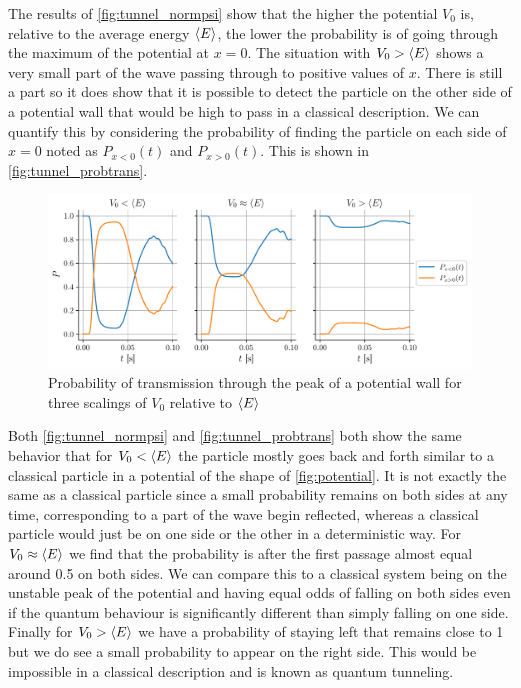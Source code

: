 The results of \autoref{fig:tunnel_normpsi} show that the higher the potential $V_0$ is, relative to the average energy $\langle E \rangle$, the lower the probability is of going through the maximum of the potential at $x=0$. The situation with $V_0 > \langle E \rangle$ shows a very small part of the wave passing through to positive values of $x$. There is still a part so it does show that it is possible to detect the particle on the other side of a potential wall that would be high to pass in a classical description. We can quantify this by considering the probability of finding the particle on each side of $x=0$ noted as $P_{x<0}(t)$ and $P_{x>0}(t)$. This is shown in \autoref{fig:tunnel_probtrans}.
\begin{figure}[h]
    \centering
    \includegraphics[width=\linewidth]{figures/tunnel_probtrans.pdf}
    \caption{Probability of transmission through the peak of a potential wall for three scalings of $V_0$ relative to $\langle E \rangle$}
    \label{fig:tunnel_probtrans}
\end{figure}

Both \autoref{fig:tunnel_normpsi} and \autoref{fig:tunnel_probtrans} both show the same behavior that for $V_0<\langle E \rangle$ the particle mostly goes back and forth similar to a classical particle in a potential of the shape of \autoref{fig:potential}. It is not exactly the same as a classical particle since a small probability remains on both sides at any time, corresponding to a part of the wave begin reflected, whereas a classical particle would just be on one side or the other in a deterministic way. For $V_0 \approx \langle E \rangle$ we find that the probability is after the first passage almost equal around 0.5 on both sides. We can compare this to a classical system being on the unstable peak of the potential and having equal odds of falling on both sides even if the quantum behaviour is significantly different than simply falling on one side. Finally for $V_0>\langle E \rangle$ we have a probability of staying left that remains close to 1 but we do see a small probability to appear on the right side. This would be impossible in a classical description and is known as quantum tunneling.

